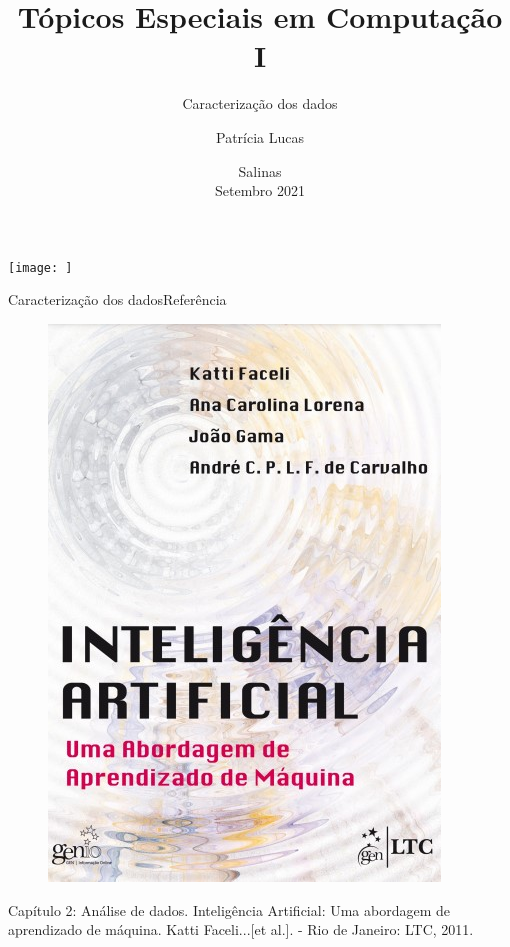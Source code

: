 \documentclass[t]{beamer}
\title[]{Tópicos Especiais em Computação I}
\subtitle[]{Caracterização dos dados}
\author[]{Patrícia Lucas\\{\footnotesize }}
\institute{Bacharelado em Sistemas de Informação \\ IFNMG  - Campus Salinas}
\date{\scriptsize Salinas\\Setembro 2021}
\begin{document}
\begin{frame}

\begin{center}
\texttt{[image: ]}
\end{center}
  \titlepage
\end{frame}

\begin{ftst}{Caracterização dos dados}{Referência}

\begin{figure}
    \includegraphics[scale=0.35]{Figuras/slide01_11.jpg}
\end{figure}
Capítulo 2: Análise de dados.
\vone
\scriptsize
Inteligência Artificial: Uma abordagem de aprendizado de máquina. Katti Faceli...[et al.]. - Rio de Janeiro: LTC, 2011.

\end{ftst}
\end{document}
